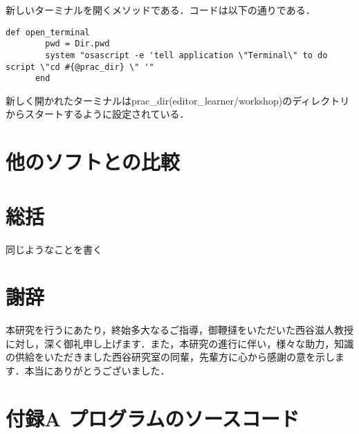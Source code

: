 新しいターミナルを開くメソッドである．コードは以下の通りである．

\begin{verbatim}
def open_terminal
        pwd = Dir.pwd
        system "osascript -e 'tell application \"Terminal\" to do script \"cd #{@prac_dir} \" '"
      end
\end{verbatim}

新しく開かれたターミナルはprac\_dir(editor\_learner/workshop)のディレクトリからスタートするように設定されている．

    \section{他のソフトとの比較}\label{ux4ed6ux306eux30bdux30d5ux30c8ux3068ux306eux6bd4ux8f03}

    \section{総括}\label{ux7dcfux62ec}

    同じようなことを書く

    \section{謝辞}\label{ux8b1dux8f9e}

本研究を行うにあたり，終始多大なるご指導，御鞭撻をいただいた西谷滋人教授に対し，深く御礼申し上げます．また，本研究の進行に伴い，様々な助力，知識の供給をいただきました西谷研究室の同輩，先輩方に心から感謝の意を示します．本当にありがとうございました．

    \section{付録A
プログラムのソースコード}\label{ux4ed8ux9332a-ux30d7ux30edux30b0ux30e9ux30e0ux306eux30bdux30fcux30b9ux30b3ux30fcux30c9}

